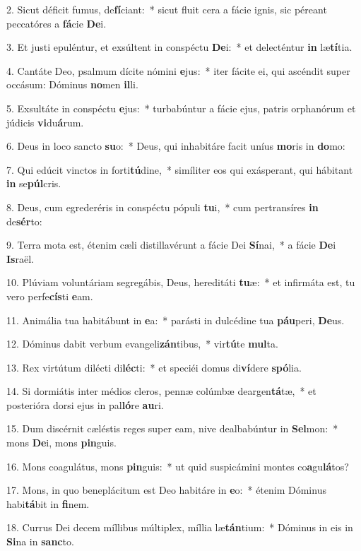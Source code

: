 2. Sicut déficit fumus, de\textbf{fí}ciant:~*  sicut fluit cera a fácie ignis, sic péreant peccatóres a \textbf{fá}cie \textbf{De}i.\

3. Et justi epuléntur, et exsúltent in conspéctu \textbf{De}i:~*  et delecténtur \textbf{in} læ\textbf{tí}tia.\

4. Cantáte Deo, psalmum dícite nómini \textbf{e}jus:~*  iter fácite ei, qui ascéndit super occásum: Dóminus \textbf{no}men \textbf{il}li.\

5. Exsultáte in conspéctu \textbf{e}jus:~*  turbabúntur a fácie ejus, patris orphanórum et júdicis \textbf{vi}du\textbf{á}rum.\

6. Deus in loco sancto \textbf{su}o:~*  Deus, qui inhabitáre facit uníus \textbf{mo}ris in \textbf{do}mo:\

7. Qui edúcit vinctos in forti\textbf{tú}dine,~*  simíliter eos qui exásperant, qui hábitant \textbf{in} se\textbf{púl}cris.\

8. Deus, cum egrederéris in conspéctu pópuli \textbf{tu}i,~*  cum pertransíres \textbf{in} de\textbf{sér}to:\

9. Terra mota est, étenim cæli distillavérunt a fácie Dei \textbf{Sí}nai,~*  a fácie \textbf{De}i \textbf{Is}raël.\

10. Plúviam voluntáriam segregábis, Deus, hereditáti \textbf{tu}æ:~*  et infirmáta est, tu vero perfe\textbf{cís}ti \textbf{e}am.\

11. Animália tua habitábunt in \textbf{e}a:~*  parásti in dulcédine tua \textbf{páu}peri, \textbf{De}us.\

12. Dóminus dabit verbum evangeli\textbf{zán}tibus,~*  vir\textbf{tú}te \textbf{mul}ta.\

13. Rex virtútum dilécti di\textbf{léc}ti:~*  et speciéi domus di\textbf{ví}dere \textbf{spó}lia.\

14. Si dormiátis inter médios cleros, pennæ colúmbæ deargen\textbf{tá}tæ,~*  et posterióra dorsi ejus in pal\textbf{ló}re \textbf{au}ri.\

15. Dum discérnit cæléstis reges super eam, nive dealbabúntur in \textbf{Sel}mon:~*  mons \textbf{De}i, mons \textbf{pin}guis.\

16. Mons coagulátus, mons \textbf{pin}guis:~*  ut quid suspicámini montes co\textbf{a}gu\textbf{lá}tos?\

17. Mons, in quo beneplácitum est Deo habitáre in \textbf{e}o:~*  étenim Dóminus habi\textbf{tá}bit in \textbf{fi}nem.\

18. Currus Dei decem míllibus múltiplex, míllia læ\textbf{tán}tium:~*  Dóminus in eis in \textbf{Si}na in \textbf{sanc}to.\

